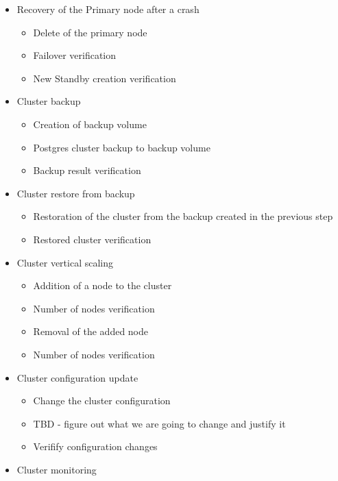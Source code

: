 \begin{itemize}
\begin{itemize}
          \end{itemize}
    \item Recovery of the Primary node after a crash
          \begin{itemize}
              \item Delete of the primary node
              \item Failover verification
              \item New Standby creation verification
          \end{itemize}
    \item Cluster backup
          \begin{itemize}
              \item Creation of backup volume
              \item Postgres cluster backup to backup volume
              \item Backup result verification
          \end{itemize}
    \item Cluster restore from backup
          \begin{itemize}
              \item Restoration of the cluster from the backup created in the previous step
              \item Restored cluster verification
          \end{itemize}
    \item Cluster vertical scaling
          \begin{itemize}
              \item Addition of a node to the cluster
              \item Number of nodes verification
              \item Removal of the added node
              \item Number of nodes verification
          \end{itemize}
    \item Cluster configuration update
          \begin{itemize}
              \item Change the cluster configuration
              \item TBD - figure out what we are going to change and justify it
              \item Verifify configuration changes
          \end{itemize}
    \item Cluster monitoring
          \begin{itemize}

\end{itemize}
\end{itemize}
